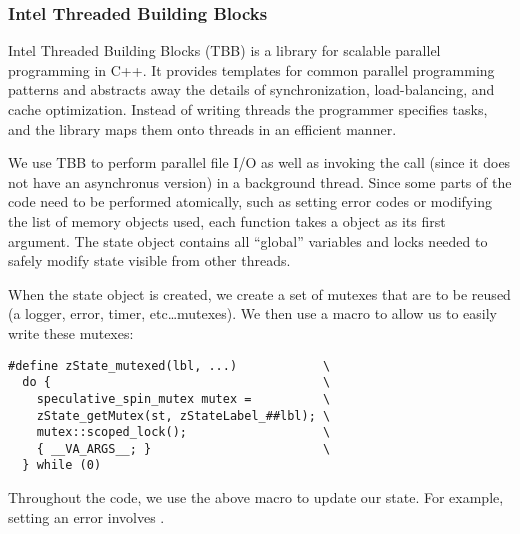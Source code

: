 
\subsubsection{Intel Threaded Building Blocks}
Intel Threaded Building Blocks\cite{reinders2007intel} (TBB) is a library for
scalable parallel
programming in C++. It provides templates for common parallel programming
patterns and abstracts away the details of synchronization, load-balancing,
and cache optimization. Instead of writing threads the programmer specifies
tasks, and the library maps them onto threads in an efficient manner.

We use TBB to perform parallel file I/O as well as invoking the
	 call (since it does not have an asynchronus version)
	in a background thread.
Since some parts of the code need to be performed atomically, such as 
	setting error codes or modifying the list of memory objects used,
	each function takes a  object as its first argument.
The state object contains all ``global'' variables and locks needed to 
	safely modify state visible from other threads.


When the state object is created, we create a set of mutexes that
	are to be reused (a logger, error, timer, etc\ldots mutexes).
We then use a macro to allow us to easily write these mutexes:

\begin{verbatim}
#define zState_mutexed(lbl, ...)            \
  do {                                      \
    speculative_spin_mutex mutex =          \
    zState_getMutex(st, zStateLabel_##lbl); \
    mutex::scoped_lock();                   \
    { __VA_ARGS__; }                        \
  } while (0)
\end{verbatim}


Throughout the code, we use the above macro to update our state.
For example, setting an error involves .


